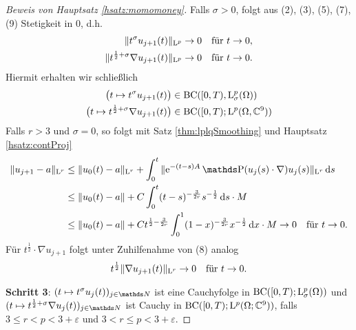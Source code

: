 \begin{proof}[Beweis von Hauptsatz \ref{hsatz:momomoney}]
  Falls $\sigma > 0$, folgt aus (2), (3), (5), (7), (9) Stetigkeit in $0$, d.h.
  \begin{align*}
    \|t^\sigma u_{j + 1}(t) \|_{\mathrm{L}^p} \to 0 &\quad\text{für } t \to 0, \\
    \|t^{\frac{1}{2} + \sigma} \nabla u_{j + 1}(t) \|_{\mathrm{L}^p} \to 0 &\quad\text{für } t\to 0.
  \end{align*}
  Hiermit erhalten wir schließlich
  \begin{align*}
    \big( t \mapsto t^\sigma u_{j + 1}(t) \big) &\in \mathrm{BC}([0,T), \mathrm{L}_\sigma^p(\Omega)) \\
    \big( t \mapsto t^{\frac{1}{2} + \sigma} \nabla u_{j + 1}(t) \big) &\in \mathrm{BC}([0,T); \mathrm{L}^p(\Omega,\mathbb{C}^9))
  \end{align*}
  Falls $r > 3$ und $\sigma = 0$, so folgt mit Satz \ref{thm:lplqSmoothing} und Hauptsatz \ref{hsatz:contProj}
  \begin{align*}
    \|u_{j + 1} - a \|_{\Ell^r}
    &\leq \|u_0(t) - a\|_{\Ell^r} + \int_0^t \|\e^{-(t - s) A} \PP(u_j(s) \cdot \nabla) u_j(s) \|_{\Ell^r} \d s \\
    &\leq \|u_0(t) - a \| + C \int_0^t (t - s)^{-\frac{3}{2r}} s^{-\frac{1}{2}} \d s \cdot M \\
    &\leq \|u_0(t) - a \| + C t^{\frac{1}{2} - \frac{3}{2r}} \int_0^1 (1 - x)^{-\frac{3}{2r}} x^{-\frac{1}{2}} \d x \cdot M \to 0 \quad\text{für } t \to 0.
  \end{align*}
  Für $t^\frac{1}{2} \cdot \nabla u_{j + 1}$ folgt unter Zuhilfenahme von (8) analog
  $$
  t^{\frac{1}{2}} \|\nabla u_{j + 1}(t) \|_{\mathrm{L}^r} \to 0 \quad\text{für } t \to 0.
  $$

  \textbf{Schritt 3}: $(t \mapsto t^\sigma u_j(t))_{j \in \N}$ ist eine Cauchyfolge in $\mathrm{BC}([0,T); \mathrm{L}^p_\sigma(\Omega))$ und $(t \mapsto t^{\frac{1}{2} + \sigma} \nabla u_j(t))_{j \in \N}$ ist Cauchy in $\mathrm{BC}([0,T); \mathrm{L}^p(\Omega; \mathbb{C}^9))$, falls $3 \leq r < p < 3 + \varepsilon$ und $3 < r \leq p < 3 + \varepsilon$.


\end{proof}
